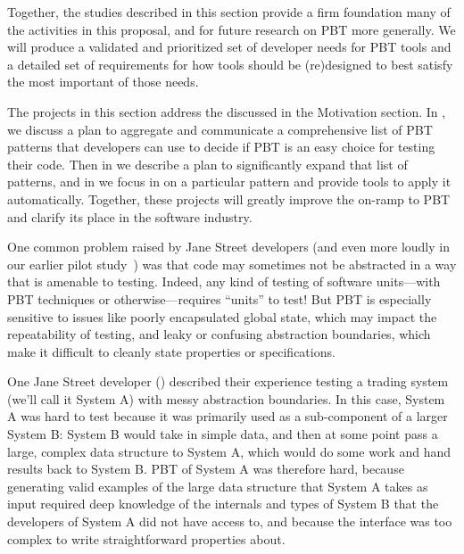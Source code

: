 
\smallskip

Together, the studies described in this section provide a firm foundation many
of the activities in this proposal, and for future research on PBT more
generally. We will produce a validated and prioritized set of developer needs
for PBT tools and a detailed set of requirements for how tools should be
(re)designed to best satisfy the most important of those needs.

The projects in this section address the 
discussed in the Motivation section. In , we discuss a
plan to aggregate and communicate a comprehensive list of PBT patterns that
developers can use to decide if PBT is an easy choice for testing their code.
Then in  we describe a plan to significantly expand
that list of patterns, and in  we focus in on a
particular pattern and provide tools to apply it automatically. Together, these
projects will greatly improve the on-ramp to PBT and clarify its place in the
software industry.



One common problem raised by Jane Street developers (and even more loudly
in our earlier pilot study~\cite{goldstein2022some}) was
that code may sometimes not be abstracted
in a way that is amenable to testing. Indeed, any kind of
testing of software units---with PBT techniques or otherwise---requires
``units'' to test!  But PBT is
especially sensitive to issues like poorly encapsulated global state, which may
impact the repeatability of testing, and leaky or confusing
abstraction boundaries, which make it difficult to cleanly state
properties or specifications.

One Jane Street developer () described their experience testing
a trading system (we'll call it System A) with messy abstraction boundaries. In
this case, System A was hard to test because it was primarily used as a
sub-component of a larger System B: System B would take in simple data, and then
at some point pass a large, complex data structure to System A, which would do
some work and hand results back to System B. PBT of System A was therefore hard,
because generating valid examples of the large data structure that System A
takes as input required deep knowledge of the internals and types of System B
that the developers of System A did not have access to, and because the
interface was too complex to write straightforward properties about.

